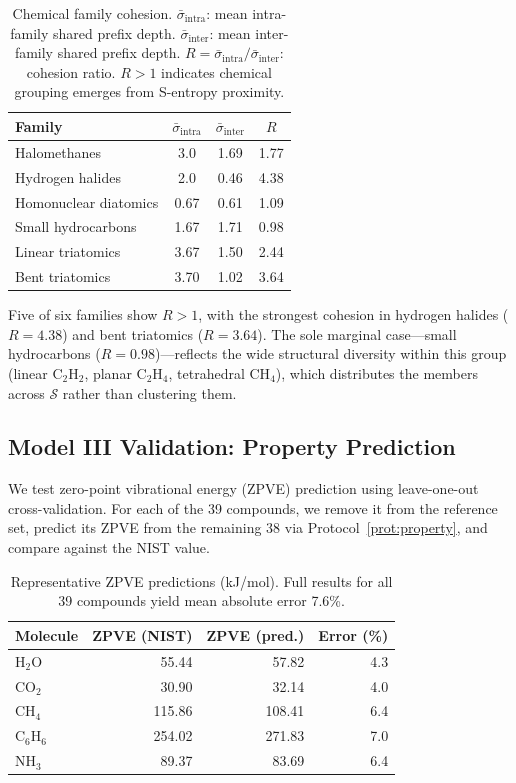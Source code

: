 \documentclass[11pt,twocolumn,a4paper]{article}
\theoremstyle{definition}
\theoremstyle{remark}
\newcommand{\Sspace}{\mathcal{S}}
\begin{document}
\begin{table}[h]
\centering
\small
\begin{tabular}{lccc}
\toprule
\textbf{Family} & $\bar{\sigma}_{\mathrm{intra}}$ & $\bar{\sigma}_{\mathrm{inter}}$ & $R$ \\
\midrule
Halomethanes & 3.0 & 1.69 & 1.77 \\
Hydrogen halides & 2.0 & 0.46 & 4.38 \\
Homonuclear diatomics & 0.67 & 0.61 & 1.09 \\
Small hydrocarbons & 1.67 & 1.71 & 0.98 \\
Linear triatomics & 3.67 & 1.50 & 2.44 \\
Bent triatomics & 3.70 & 1.02 & 3.64 \\
\bottomrule
\end{tabular}
\caption{Chemical family cohesion. $\bar{\sigma}_{\mathrm{intra}}$: mean intra-family shared prefix depth. $\bar{\sigma}_{\mathrm{inter}}$: mean inter-family shared prefix depth. $R = \bar{\sigma}_{\mathrm{intra}}/\bar{\sigma}_{\mathrm{inter}}$: cohesion ratio. $R > 1$ indicates chemical grouping emerges from S-entropy proximity.}
\label{tab:cohesion}
\end{table}

Five of six families show $R > 1$, with the strongest cohesion in hydrogen halides ($R = 4.38$) and bent triatomics ($R = 3.64$). The sole marginal case---small hydrocarbons ($R = 0.98$)---reflects the wide structural diversity within this group (linear C$_2$H$_2$, planar C$_2$H$_4$, tetrahedral CH$_4$), which distributes the members across $\Sspace$ rather than clustering them.

\subsection{Model III Validation: Property Prediction}

We test zero-point vibrational energy (ZPVE) prediction using leave-one-out cross-validation. For each of the 39 compounds, we remove it from the reference set, predict its ZPVE from the remaining 38 via Protocol~\ref{prot:property}, and compare against the NIST value.

\begin{table}[h]
\centering
\small
\begin{tabular}{lrrr}
\toprule
\textbf{Molecule} & \textbf{ZPVE (NIST)} & \textbf{ZPVE (pred.)} & \textbf{Error (\%)} \\
\midrule
H$_2$O & 55.44 & 57.82 & 4.3 \\
CO$_2$ & 30.90 & 32.14 & 4.0 \\
CH$_4$ & 115.86 & 108.41 & 6.4 \\
C$_6$H$_6$ & 254.02 & 271.83 & 7.0 \\
NH$_3$ & 89.37 & 83.69 & 6.4 \\
\bottomrule
\end{tabular}
\caption{Representative ZPVE predictions (kJ/mol). Full results for all 39 compounds yield mean absolute error 7.6\%.}
\label{tab:zpve}
\end{table}
\end{document}
